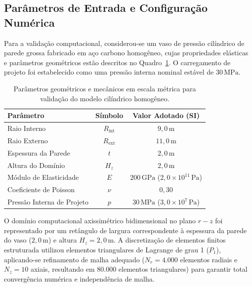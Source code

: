 \subsection{Parâmetros de Entrada e Configuração Numérica}

Para a validação computacional, considerou-se um vaso de pressão cilíndrico de parede grossa fabricado em aço carbono homogêneo, cujas propriedades elásticas e parâmetros geométricos estão descritos no Quadro~\ref{tab:parametros_validacao_v3}. O carregamento de projeto foi estabelecido como uma pressão interna nominal estável de $30 \, \text{MPa}$.

\begin{table}[htbp]
  \centering
  \caption{Parâmetros geométricos e mecânicos em escala métrica para validação do modelo cilíndrico homogêneo.}
  \label{tab:parametros_validacao_v3}
  \begin{tabular}{|l|c|c|}
    \hline
    \textbf{Parâmetro} & \textbf{Símbolo} & \textbf{Valor Adotado (SI)} \\ \hline
    Raio Interno & $R_{\text{int}}$ & $9,0 \, \text{m}$ \\ \hline
    Raio Externo & $R_{\text{ext}}$ & $11,0 \, \text{m}$ \\ \hline
    Espessura da Parede & $t$ & $2,0 \, \text{m}$ \\ \hline
    Altura do Domínio & $H_z$ & $2,0 \, \text{m}$ \\ \hline
    Módulo de Elasticidade & $E$ & $200 \, \text{GPa}$ ($2,0 \times 10^{11} \, \text{Pa}$) \\ \hline
    Coeficiente de Poisson & $\nu$ & $0,30$ \\ \hline
    Pressão Interna de Projeto & $p$ & $30 \, \text{MPa}$ ($3,0 \times 10^7 \, \text{Pa}$) \\ \hline
  \end{tabular}
\end{table}

O domínio computacional axissimétrico bidimensional no plano $r-z$ foi representado por um retângulo de largura correspondente à espessura da parede do vaso ($2,0 \, \text{m}$) e altura $H_z = 2,0 \, \text{m}$. A discretização de elementos finitos estruturada utilizou elementos triangulares de Lagrange de grau 1 ($P_1$), aplicando-se refinamento de malha adequado ($N_r = 4.000$ elementos radiais e $N_z = 10$ axiais, resultando em $80.000$ elementos triangulares) para garantir total convergência numérica e independência de malha.

